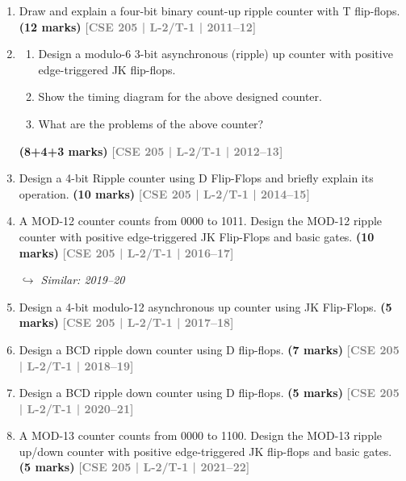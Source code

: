 \documentclass[12pt,a4paper]{article}
\newcommand{\yr}[1]{\hfill\textcolor{gray}{\small\textbf{[#1]}}}
\newcommand{\mk}[1]{\textcolor{orange!70!black}{\small\textbf{(#1 marks)}}}
\newcommand{\variant}[1]{\par\vspace{1pt}\textcolor{blue!50!black}%
  {\footnotesize\textit{$\hookrightarrow$ Similar: #1}}}
\begin{document}
\begin{enumerate}

\item Draw and explain a four-bit binary count-up ripple counter with T flip-flops.
\mk{12} \yr{CSE 205 | L-2/T-1 | 2011--12}

\item
\begin{enumerate}
  \item Design a modulo-6 3-bit asynchronous (ripple) up counter with positive edge-triggered JK flip-flops.
  \item Show the timing diagram for the above designed counter.
  \item What are the problems of the above counter?

  \end{enumerate}
\mk{8+4+3} \yr{CSE 205 | L-2/T-1 | 2012--13}

\item Design a 4-bit Ripple counter using D Flip-Flops and briefly explain its operation.
\mk{10} \yr{CSE 205 | L-2/T-1 | 2014--15}


\item A MOD-12 counter counts from 0000 to 1011. Design the MOD-12 ripple counter with positive edge-triggered JK Flip-Flops and basic gates.
\mk{10} \yr{CSE 205 | L-2/T-1 | 2016--17}
\variant{2019--20}

\item Design a 4-bit modulo-12 asynchronous up counter using JK Flip-Flops.
\mk{5} \yr{CSE 205 | L-2/T-1 | 2017--18}


\item Design a BCD ripple down counter using D flip-flops.
\mk{7} \yr{CSE 205 | L-2/T-1 | 2018--19}

\item Design a BCD ripple down counter using D flip-flops.
\mk{5} \yr{CSE 205 | L-2/T-1 | 2020--21}

\item A MOD-13 counter counts from 0000 to 1100. Design the MOD-13 ripple up/down counter with positive edge-triggered JK flip-flops and basic gates.
\mk{5} \yr{CSE 205 | L-2/T-1 | 2021--22}


\end{enumerate}
\end{document}
